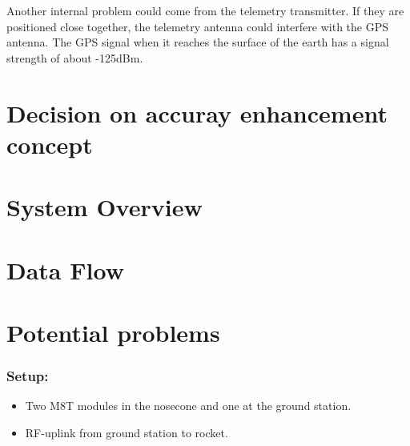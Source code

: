 Another internal problem could come from the telemetry transmitter.
If they are positioned close together, the telemetry antenna could interfere with the GPS antenna.
The GPS signal when it reaches the surface of the earth has a signal strength of about -125dBm.

\section{Decision on accuray enhancement concept}

\section{System Overview}

\section{Data Flow}

\section{Potential problems}



\subsubsection{Setup:}
\begin{itemize}
 \item Two M8T modules in the nosecone and one at the ground station.
 
 \item RF-uplink from ground station to rocket.
\end{itemize}


